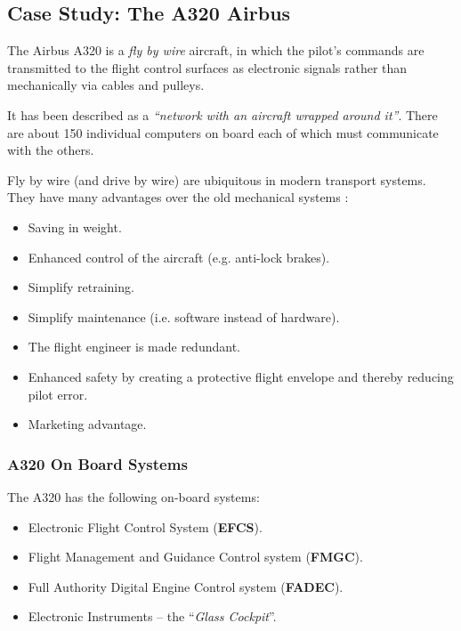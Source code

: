 \subsection{Case Study: The A320 Airbus}

 The Airbus A320 is a \emph{fly by wire} aircraft, in which the pilot's
  commands are transmitted to the flight control surfaces as electronic
  signals rather than mechanically via cables and pulleys.

  It has been described as a \emph{``network with an aircraft wrapped
  around it''}.  There are about 150 individual computers on board each
  of which must communicate with the others.

  Fly by wire (and drive by wire) are ubiquitous in modern transport systems. They have many advantages over the old mechanical systems \cite{mellor1994cad}:

  \begin{itemize}

  \item Saving in weight.

  \item Enhanced control of the aircraft (e.g. anti-lock brakes).

  \item Simplify retraining.

  \item Simplify maintenance (i.e. software instead of hardware).

  \item The flight engineer is made redundant.

  \item Enhanced safety by creating a protective flight envelope  and
  thereby reducing pilot error.

  \item Marketing advantage.

  \end{itemize}




  \subsubsection*{A320 On Board Systems}

 The A320 has the following on-board systems:

  \begin{itemize}

  \item Electronic Flight Control System ({\bf EFCS}).

  \item Flight Management and Guidance Control system ({\bf FMGC}).

  \item Full Authority Digital Engine Control system ({\bf FADEC}).

  \item Electronic Instruments -- the ``\emph{Glass Cockpit}''.

  \end{itemize}    



